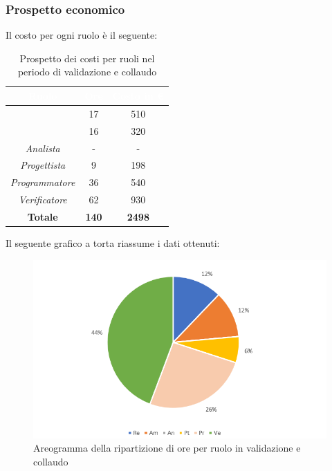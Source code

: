 \subsubsection{Prospetto economico}
Il costo per ogni ruolo è il seguente:
\begin{table}[H]
	\begin{center}
		\begin{tabular}{ |c c c| }
		\rowcolor{darkblue} 
		\textcolor{white}{\textbf{Ruolo}} & \textcolor{white}{\textbf{Ore}} & \textcolor{white}{\textbf{Costo in €}}\\ \hline
		{\Responsabile} 			& 17 	& 510 \\ \hline
		{\Amministratore}		 	& 16 	& 320 \\ \hline
		\textit{Analista} 			& - 	& - \\ \hline
		\textit{Progettista} 		& 9 	& 198 \\ \hline
		\textit{Programmatore}  	& 36 	& 540 \\ \hline
		\textit{Verificatore} 		& 62 	& 930 \\ \hline
		\textbf{Totale} & \textbf{140} & \textbf{2498} \\ \hline
		\end{tabular}
	\caption{Prospetto dei costi per ruoli nel periodo di validazione e collaudo}
	\end{center}
\end{table}
Il seguente grafico a torta riassume i dati ottenuti:
\begin{figure}[H]
    \centering
    \includegraphics[scale = 0.75]{Immagini/ValidazioneTorta.png}
    \caption{Areogramma della ripartizione di ore per ruolo in validazione e collaudo}
    \label{fig:Areogramma ripartizione ore, periodo di Validazione e Collaudo}
\end{figure}
